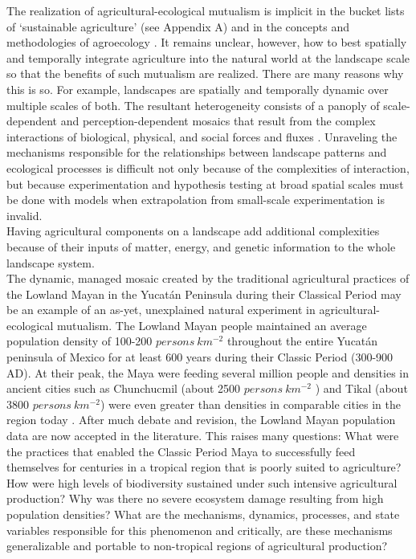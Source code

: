 \documentclass[twoside]{article}	%
\begin{document}
The realization of agricultural-ecological mutualism is implicit in the bucket lists of \enquote*{sustainable agriculture} (see Appendix A) and in the concepts and methodologies of agroecology \citep{gliessman_agroecology:_2015}. It remains unclear, however, how to best spatially and temporally integrate agriculture into the natural world at the landscape scale so that the benefits of such mutualism are realized. There are many reasons why this is so. For example, landscapes are spatially and temporally dynamic over multiple scales of both. The resultant heterogeneity consists of a panoply of scale-dependent and perception-dependent mosaics that result from the complex interactions of biological, physical, and social forces and fluxes \citep{turner_landscape_1989}. Unraveling the mechanisms responsible for the relationships between landscape patterns and ecological processes is difficult not only because of the complexities of interaction, but because experimentation and hypothesis testing at broad spatial scales must be done with models when extrapolation from small-scale experimentation is invalid. \\

Having agricultural components on a landscape add additional complexities because of their inputs of matter, energy, and genetic information to the whole landscape system. \\

The dynamic, managed mosaic created by the traditional agricultural practices of the Lowland Mayan in the Yucat\'{a}n Peninsula during their Classical Period may be an example of an as-yet, unexplained natural experiment in agricultural-ecological mutualism. The Lowland Mayan people maintained an average population density of 100-200 $persons \ km^{-2}$ throughout the entire Yucat\'{a}n peninsula of Mexico for at least 600 years during their Classic Period (300-900 AD). At their peak, the Maya were feeding several million people \citep{gomez-pompa_lowland_2003} and densities in ancient cities such as Chunchucmil (about 2500  $persons \ km^{-2}$ ) and Tikal (about 3800 $persons \ km^{-2}$) were even greater than densities in comparable cities in the region today \citep{dahlin_reconstructing_2005, faust_maya_2001}.  After much debate and revision, the Lowland Mayan population data are now accepted in the literature. This raises many questions: What were the practices that enabled the Classic Period Maya to successfully feed themselves for centuries in a tropical region that is poorly suited to agriculture?  How were high levels of biodiversity sustained under such intensive agricultural production?  Why was there no severe ecosystem damage resulting from high population densities? What are the mechanisms, dynamics, processes, and state variables responsible for this phenomenon and critically, are these mechanisms generalizable and portable to non-tropical regions of agricultural production? \\
\end{document}
